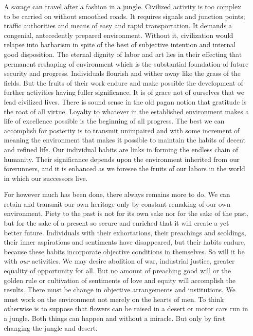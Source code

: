 \documentclass[12pt]{article}
\begin{document}
A savage can travel after a fashion in a jungle.
Civilized activity is too complex to be carried on without
smoothed roads. It requires signals and junction
points; traffic authorities and means of easy and rapid
transportation. It demands a congenial, antecedently
prepared environment. Without it, civilization would
relapse into barbarism in spite of the best of subjective
intention and internal good disposition. The eternal
dignity of labor and art lies in their effecting that permanent
reshaping of environment which is the substantial
foundation of future security and progress. Individuals
flourish and wither away like the grass of the
fields. But the fruits of their work endure and make
possible the development of further activities having
fuller significance. It is of grace not of ourselves that
we lead civilized lives. There is sound sense in the old
pagan notion that gratitude is the root of all virtue.
Loyalty to whatever in the established environment
makes a life of excellence possible is the beginning of
all progress. The best we can accomplish for posterity
is to transmit unimpaired and with some increment of
meaning the environment that makes it possible to
maintain the habits of decent and refined life. Our
individual habits are links in forming the endless chain
of humanity. Their significance depends upon the environment
inherited from our forerunners, and it is
enhanced as we foresee the fruits of our labors in the
world in which our successors live.

For however much has been done, there always remains
more to do. We can retain and transmit our own
heritage only by constant remaking of our own environment.
Piety to the past is not for its own sake nor for
the sake of the past, but for the sake of a present so
secure and enriched that it will create a yet better
future. Individuals with their exhortations, their
preachings and scoldings, their inner aspirations and
sentiments have disappeared, but their habits endure,
because these habits incorporate objective conditions in
themselves. So will it be with \emph{our} activities. We may
desire abolition of war, industrial justice, greater
equality of opportunity for all. But no amount of
preaching good will or the golden rule or cultivation
of sentiments of love and equity will accomplish the
results. There must be change in objective arrangements
and institutions. We must work on the environment
not merely on the hearts of men. To think otherwise
is to suppose that flowers can be raised in a desert
or motor cars run in a jungle. Both things can happen
and without a miracle. But only by first changing the
jungle and desert.
\end{document}

